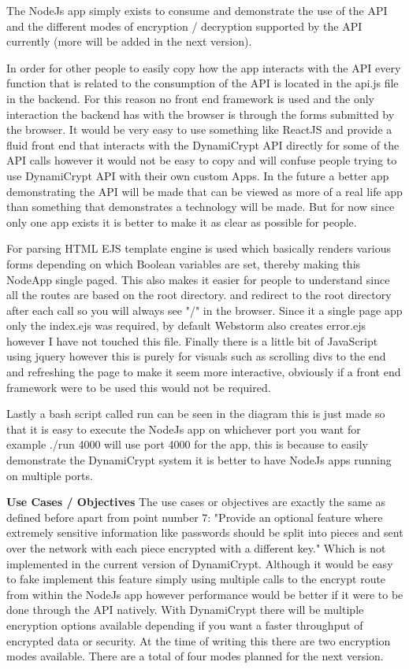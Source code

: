 The NodeJs app simply exists to consume and demonstrate the use of the API and the different modes of encryption / decryption supported by the API currently (more will be added in the next version). 

In order for other people to easily copy how the app interacts with the API every function that is related to the consumption of the API is located in the api.js file in the backend. For this reason no front end framework is used and the only interaction the backend has with the browser is through the forms submitted by the browser. It would be very easy to use something like ReactJS and provide a fluid front end that interacts with the DynamiCrypt API directly for some of the API calls however it would not be easy to copy and will confuse people trying to use DynamiCrypt API with their own custom Apps. In the future a better app demonstrating the API will be made that can be viewed as more of a real life app than something that demonstrates a technology will be made. But for now since only one app exists it is better to make it as clear as possible for people.

For parsing HTML EJS template engine is used which basically renders various forms depending on which Boolean variables are set, thereby making this NodeApp single paged. This also makes it easier for people to understand since all the routes are based on the root directory. and redirect to the root directory after each call so you will always see "/" in the browser. Since it a single page app only the index.ejs was required, by default Webstorm also creates error.ejs however I have not touched this file. Finally there is a little bit of JavaScript using jquery however this is purely for visuals such as scrolling divs to the end and refreshing the page to make it seem more interactive, obviously if a front end framework were to be used this would not be required.

Lastly a bash script called run can be seen in the diagram this is just made so that it is easy to execute the NodeJs app on whichever port you want for example ./run 4000 will use port 4000 for the app, this is because to easily demonstrate the DynamiCrypt system it is better to have NodeJs apps running on multiple ports.

\textbf{Use Cases / Objectives}
The use cases or objectives are exactly the same as defined before apart from point number 7: 
"Provide an optional feature where extremely sensitive information like passwords should be split into pieces and sent over the network with each piece encrypted with a different key."
Which is not implemented in the current version of DynamiCrypt. 
Although it would be easy to fake implement this feature simply using multiple calls to the encrypt route from within the NodeJs app however performance would be better if it were to be done through the API natively.
With DynamiCrypt there will be multiple encryption options available depending if you want a faster throughput of encrypted data or security.
At the time of writing this there are two encryption modes available. There are a total of four modes planned for the next version.

